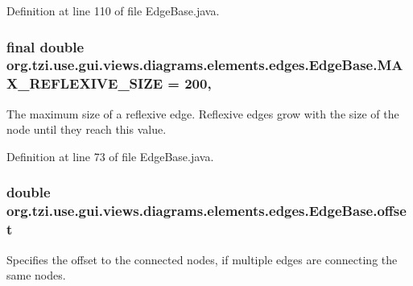 Definition at line 110 of file Edge\-Base.\-java.

\hypertarget{classorg_1_1tzi_1_1use_1_1gui_1_1views_1_1diagrams_1_1elements_1_1edges_1_1_edge_base_a4775f6afdf072ebdda906b123787f351}{
\subsubsection[{M\-A\-X\-\_\-\-R\-E\-F\-L\-E\-X\-I\-V\-E\-\_\-\-S\-I\-Z\-E}]{\setlength{\rightskip}{0pt plus 5cm}final double org.\-tzi.\-use.\-gui.\-views.\-diagrams.\-elements.\-edges.\-Edge\-Base.\-M\-A\-X\-\_\-\-R\-E\-F\-L\-E\-X\-I\-V\-E\-\_\-\-S\-I\-Z\-E = 200\hspace{0.3cm}{\ttfamily [static]}, {\ttfamily [protected]}}}\label{classorg_1_1tzi_1_1use_1_1gui_1_1views_1_1diagrams_1_1elements_1_1edges_1_1_edge_base_a4775f6afdf072ebdda906b123787f351}
The maximum size of a reflexive edge. Reflexive edges grow with the size of the node until they reach this value. 

Definition at line 73 of file Edge\-Base.\-java.

\hypertarget{classorg_1_1tzi_1_1use_1_1gui_1_1views_1_1diagrams_1_1elements_1_1edges_1_1_edge_base_a5bd3c72d94b67ecd02f733f36dce3821}{
\subsubsection[{offset}]{\setlength{\rightskip}{0pt plus 5cm}double org.\-tzi.\-use.\-gui.\-views.\-diagrams.\-elements.\-edges.\-Edge\-Base.\-offset\hspace{0.3cm}{\ttfamily [protected]}}}\label{classorg_1_1tzi_1_1use_1_1gui_1_1views_1_1diagrams_1_1elements_1_1edges_1_1_edge_base_a5bd3c72d94b67ecd02f733f36dce3821}
Specifies the offset to the connected nodes, if multiple edges are connecting the same nodes. 


